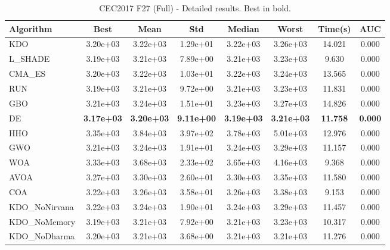 \begin{table}[H]
\centering\small
\caption{CEC2017 F27 (Full) - Detailed results. Best in bold.}
\label{tab:cec2017_F27}
\begin{tabular}{lccccccc}
\toprule
\textbf{Algorithm} & \textbf{Best} & \textbf{Mean} & \textbf{Std} & \textbf{Median} & \textbf{Worst} & \textbf{Time(s)} & \textbf{AUC} \\
\midrule
KDO & 3.20e+03 & 3.22e+03 & 1.29e+01 & 3.22e+03 & 3.26e+03 & 14.021 & 0.000 \\
L_SHADE & 3.19e+03 & 3.21e+03 & 7.89e+00 & 3.21e+03 & 3.23e+03 & 9.630 & 0.000 \\
CMA_ES & 3.20e+03 & 3.22e+03 & 1.03e+01 & 3.22e+03 & 3.24e+03 & 13.565 & 0.000 \\
RUN & 3.19e+03 & 3.21e+03 & 9.72e+00 & 3.21e+03 & 3.23e+03 & 11.831 & 0.000 \\
GBO & 3.21e+03 & 3.24e+03 & 1.51e+01 & 3.23e+03 & 3.27e+03 & 14.826 & 0.000 \\
DE & \textbf{3.17e+03} & \textbf{3.20e+03} & \textbf{9.11e+00} & \textbf{3.19e+03} & \textbf{3.21e+03} & \textbf{11.758} & \textbf{0.000} \\
HHO & 3.35e+03 & 3.84e+03 & 3.97e+02 & 3.78e+03 & 5.01e+03 & 12.976 & 0.000 \\
GWO & 3.21e+03 & 3.24e+03 & 1.91e+01 & 3.24e+03 & 3.29e+03 & 11.157 & 0.000 \\
WOA & 3.33e+03 & 3.68e+03 & 2.33e+02 & 3.65e+03 & 4.16e+03 & 9.368 & 0.000 \\
AVOA & 3.27e+03 & 3.30e+03 & 2.60e+01 & 3.30e+03 & 3.35e+03 & 11.580 & 0.000 \\
COA & 3.22e+03 & 3.26e+03 & 3.58e+01 & 3.26e+03 & 3.38e+03 & 9.153 & 0.000 \\
KDO_NoNirvana & 3.22e+03 & 3.24e+03 & 1.90e+01 & 3.24e+03 & 3.29e+03 & 11.457 & 0.000 \\
KDO_NoMemory & 3.19e+03 & 3.21e+03 & 7.92e+00 & 3.21e+03 & 3.23e+03 & 10.317 & 0.000 \\
KDO_NoDharma & 3.20e+03 & 3.21e+03 & 3.68e+00 & 3.21e+03 & 3.21e+03 & 11.276 & 0.000 \\
\bottomrule
\end{tabular}
\end{table}
